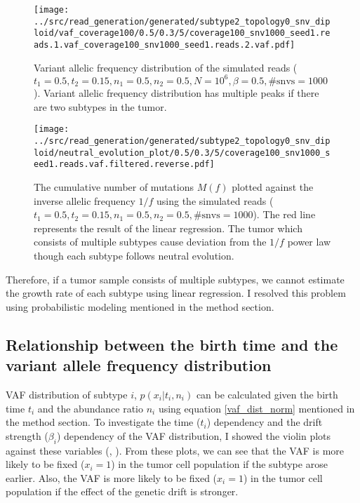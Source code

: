 \documentclass{article}
\begin{document}
\begin{figure}[H]
 \begin{minipage}[c]{0.47\hsize}
 \begin{center}
  \texttt{[image: ../src/read\_generation/generated/subtype2\_topology0\_snv\_diploid/vaf\_coverage100/0.5/0.3/5/coverage100\_snv1000\_seed1.reads.1.vaf\_coverage100\_snv1000\_seed1.reads.2.vaf.pdf]}
 \end{center}
    \caption{
  Variant allelic frequency distribution of the simulated reads ($t_1 = 0.5, t_2=0.15, n_1=0.5, n_2=0.5, N=10^6, \beta=0.5, \text{\#snvs}=1000$).
  Variant allelic frequency distribution has multiple peaks if there are two subtypes in the tumor.
  }\label{simulated_vaf}
\end{minipage}
 \hspace{1truecm}
\begin{minipage}[c]{0.47\hsize}
 \begin{center}
  \texttt{[image: ../src/read\_generation/generated/subtype2\_topology0\_snv\_diploid/neutral\_evolution\_plot/0.5/0.3/5/coverage100\_snv1000\_seed1.reads.vaf.filtered.reverse.pdf]}
 \end{center}
   \caption{
  The cumulative number of mutations $M(f)$ plotted against the inverse allelic frequency $1/f$
  using the simulated reads ($t_1 = 0.5, t_2=0.15, n_1=0.5, n_2=0.5, \text{\#snvs}=1000$).
  The red line represents the result of the linear regression.
 The tumor which consists of multiple subtypes cause deviation from the $1/f$ power law though each subtype follows neutral evolution.
  }
 \label{simulated_linear_regression}
\end{minipage}
\end{figure}

Therefore, if a tumor sample consists of multiple subtypes, we cannot estimate the growth rate of each subtype using linear regression.
I resolved this problem using probabilistic modeling mentioned in the method section.

\subsection{Relationship between the birth time and the variant allele frequency distribution}
VAF distribution of subtype $i$, $p(x_i | t_i, n_i)$ can be calculated given the birth time $t_i$ and the abundance ratio $n_i$ using equation \eqref{vaf_dist_norm} mentioned in the method section. To investigate the time ($t_i$) dependency and the drift strength ($\beta_i$) dependency of the VAF distribution, I showed the violin plots against these variables (, ). From these plots, we can see that the VAF is more likely to be fixed ($x_i = 1$) in the tumor cell population if the subtype arose earlier. Also, the VAF is more likely to be fixed ($x_i = 1$) in the tumor cell population if the effect of the genetic drift is stronger.
\end{document}

